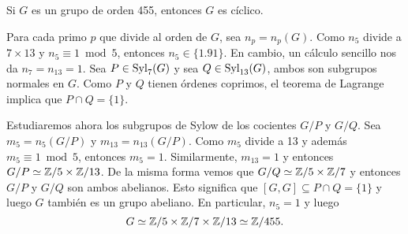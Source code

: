\begin{example}
Si $G$ es un grupo de orden 455, entonces $G$ es cíclico. 

Para cada primo $p$ que divide al orden de $G$, sea $n_p=n_p(G)$. Como $n_5$ divide a $7\times 13$ y $n_5\equiv 1\bmod 5$, entonces $n_5\in\{1.91\}$. En cambio,
un cálculo sencillo nos da $n_7=n_{13}=1$. Sea $P\in\mathrm{Syl}_7(G)$ y sea $Q\in\mathrm{Syl}_{13}(G)$, ambos son subgrupos normales en $G$. Como $P$ y $Q$ tienen órdenes coprimos, el teorema de Lagrange implica que $P\cap Q=\{1\}$. 

Estudiaremos ahora los subgrupos de Sylow
de los cocientes $G/P$ y $G/Q$. 
Sea $m_5=n_5(G/P)$ y $m_{13}=n_{13}(G/P)$. Como $m_5$ divide a 13 y además $m_5\equiv1\bmod 5$, entonces $m_5=1$. Similarmente, $m_{13}=1$ y entonces $G/P\simeq\mathbb{Z}/5\times\mathbb{Z}/13$. De la misma forma vemos que $G/Q\simeq\mathbb{Z}/5\times\mathbb{Z}/7$ y entonces $G/P$ y $G/Q$ son ambos abelianos. Esto significa que 
$[G,G]\subseteq P\cap Q=\{1\}$ y luego $G$ también es un grupo abeliano. En particular, $n_5=1$ y luego
\[
G\simeq\mathbb{Z}/5\times\mathbb{Z}/7\times\mathbb{Z}/13\simeq\mathbb{Z}/455.
\]  	
\end{example}



